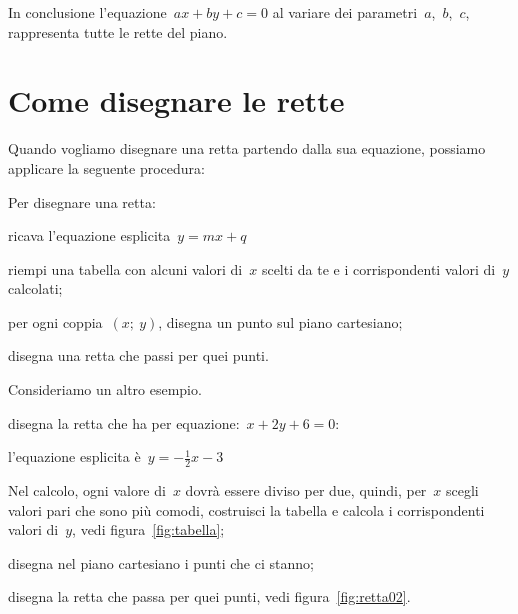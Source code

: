 \begin{inaccessibleblock}
 \begin{minipage}[]{.50\textwidth}
  \begin{center}\end{center}
 \end{minipage}
 \begin{minipage}[]{.40\textwidth}
  \begin{center}\end{center}
 \end{minipage}
\end{inaccessibleblock}

In conclusione l'equazione~$ax + by + c = 0$ al variare dei 
parametri~$a$,~$b$,~$c$, rappresenta tutte le rette del piano.

\section{Come disegnare le rette}
\label{sec:retta_disegno}

Quando vogliamo disegnare una retta partendo dalla sua equazione, possiamo
applicare la seguente procedura:

\begin{procedura}
 Per disegnare una retta:
 \begin{enumeratea}
  \item ricava l'equazione esplicita~$y=mx+q$
  \item riempi una tabella con alcuni valori di~$x$ scelti da te e i 
   corrispondenti valori di~$y$ calcolati;
  \item per ogni coppia~$(x;~y)$, disegna un punto sul piano cartesiano;
  \item disegna una retta che passi per quei punti.
 \end{enumeratea}
\end{procedura}

Consideriamo un altro esempio. 

\begin{procedura}
 disegna la retta che ha per equazione:~$x+2y+6=0$:
 \begin{enumeratea}
  \item l'equazione esplicita è~$y=- \frac{1}{2}x - 3$
  \item Nel calcolo, ogni valore di~$x$ dovrà essere diviso per due, 
   quindi, per~$x$ scegli valori pari che sono più comodi, costruisci la 
   tabella e calcola i corrispondenti valori di~$y$, 
   vedi figura~\ref{fig:tabella};
  \item disegna nel piano cartesiano i punti che ci stanno;
  \item disegna la retta che passa per quei punti, 
   vedi figura~\ref{fig:retta02}.
 \end{enumeratea}
\end{procedura}

